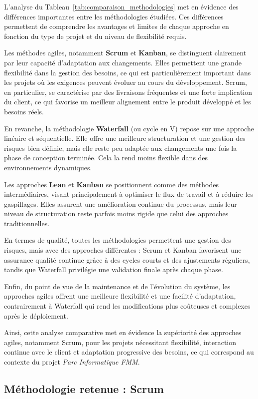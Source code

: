 L’analyse du Tableau~\ref{tab:comparaison_methodologies} met en évidence des différences importantes entre les méthodologies étudiées. Ces différences permettent de comprendre les avantages et limites de chaque approche en fonction du type de projet et du niveau de flexibilité requis.

Les méthodes agiles, notamment \textbf{Scrum} et \textbf{Kanban}, se distinguent clairement par leur capacité d’adaptation aux changements. Elles permettent une grande flexibilité dans la gestion des besoins, ce qui est particulièrement important dans les projets où les exigences peuvent évoluer au cours du développement. Scrum, en particulier, se caractérise par des livraisons fréquentes et une forte implication du client, ce qui favorise un meilleur alignement entre le produit développé et les besoins réels.

En revanche, la méthodologie \textbf{Waterfall} (ou cycle en V) repose sur une approche linéaire et séquentielle. Elle offre une meilleure structuration et une gestion des risques bien définie, mais elle reste peu adaptée aux changements une fois la phase de conception terminée. Cela la rend moins flexible dans des environnements dynamiques.

Les approches \textbf{Lean} et \textbf{Kanban} se positionnent comme des méthodes intermédiaires, visant principalement à optimiser le flux de travail et à réduire les gaspillages. Elles assurent une amélioration continue du processus, mais leur niveau de structuration reste parfois moins rigide que celui des approches traditionnelles.

En termes de qualité, toutes les méthodologies permettent une gestion des risques, mais avec des approches différentes : Scrum et Kanban favorisent une assurance qualité continue grâce à des cycles courts et des ajustements réguliers, tandis que Waterfall privilégie une validation finale après chaque phase.

Enfin, du point de vue de la maintenance et de l’évolution du système, les approches agiles offrent une meilleure flexibilité et une facilité d’adaptation, contrairement à Waterfall qui rend les modifications plus coûteuses et complexes après le déploiement.

Ainsi, cette analyse comparative met en évidence la supériorité des approches agiles, notamment Scrum, pour les projets nécessitant flexibilité, interaction continue avec le client et adaptation progressive des besoins, ce qui correspond au contexte du projet \textit{Parc Informatique FMM}.
\subsection{Méthodologie retenue : Scrum}

